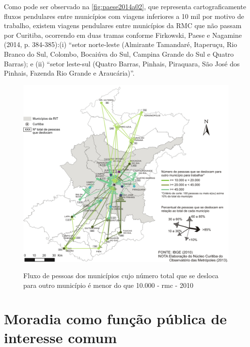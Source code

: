 	Como pode ser observado na \autoref{fig:paese2014a02}, que representa cartograficamente fluxos pendulares entre municípios com viagens inferiores a 10 mil por motivo de trabalho, existem viagens pendulares entre municípios da RMC que não passam por Curitiba, ocorrendo em duas tramas conforme Firkowski, Paese e Nagamine (2014, p. 384-385):(i) “setor norte-leste (Almirante Tamandaré, Itaperuçu, Rio Branco do Sul, Colombo, Bocaiúva do Sul, Campina Grande do Sul e Quatro Barras); e (ii) ``setor leste-sul (Quatro Barras, Pinhais, Piraquara, São José dos Pinhais, Fazenda Rio Grande e Araucária)''.

	\begin{figure}
		\centering
		\caption{Fluxo de pessoas dos municípios cujo número total que se desloca para outro município é menor do que 10.000 - \gls{rmc} - 2010}
		\includegraphics[width=0.7\linewidth]{img/paese2014a_02}
		\label{fig:paese2014a02}
	\end{figure}
	
	\section{Moradia como função pública de interesse comum}
	
